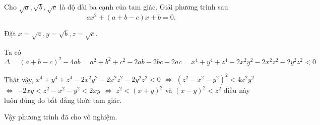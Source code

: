 \begin{ex}%
    Cho $\sqrt{a}, \sqrt{b}, \sqrt{c}$ là độ dài ba cạnh của tam giác. Giải phương trình sau
    $$ax^2+(a+b-c)x+b=0.$$
\loigiai
    {
    Đặt $x=\sqrt{a},y=\sqrt{b},z=\sqrt{c}$.
    
    Ta có $$\Delta=(a+b-c)^2-4ab=a^2+b^2+c^2-2ab-2bc-2ac=x^4+y^4+z^4-2x^2y^2-2x^2z^2-2y^2z^2<0$$
   
 Thật vậy, $x^4+y^4+z^4-2x^2y^2-2x^2z^2-2y^2z^2<0$
 $\Leftrightarrow$ $ (z^2-x^2-y^2)^2<4x^2y^2$
 $\Leftrightarrow$ $ -2xy<z^2-x^2-y^2<2xy$
 $\Leftrightarrow$ $ z^2<(x+y)^2$ và $(x-y)^2<z^2$ điều này luôn đúng do bất đẳng thức tam giác.
 
 Vậy phương trình đã cho vô nghiệm.
    }
\end{ex}  
